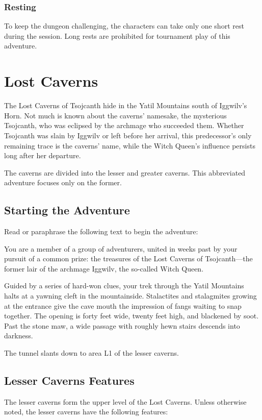 \documentclass[10pt,a4paper,twoside,bg=print,twocolumn,openany,nodeprecatedcode]{dndbook}
\begin{document}
\subsubsection{Resting}
To keep the dungeon challenging, the characters can take only one short rest during the session. Long rests are prohibited for tournament play of this adventure.

\section{Lost Caverns}
The Lost Caverns of Tsojcanth hide in the Yatil Mountains south of Iggwilv's Horn. Not much is known about the caverns' namesake, the mysterious Tsojcanth, who was eclipsed by the archmage who succeeded them. Whether Tsojcanth was slain by Iggwilv or left before her arrival, this predecessor's only remaining trace is the caverns' name, while the Witch Queen's influence persists long after her departure.

The caverns are divided into the lesser and greater caverns. This abbreviated adventure focuses only on the former.

\subsection{Starting the Adventure}
Read or paraphrase the following text to begin the adventure:

\begin{DndReadAloud}{}
You are a member of a group of adventurers, united in weeks past by your pursuit of a common prize: the treasures of the Lost Caverns of Tsojcanth—the former lair of the archmage Iggwilv, the so-called Witch Queen.

Guided by a series of hard-won clues, your trek through the Yatil Mountains halts at a yawning cleft in the mountainside. Stalactites and stalagmites growing at the entrance give the cave mouth the impression of fangs waiting to snap together. The opening is forty feet wide, twenty feet high, and blackened by soot. Past the stone maw, a wide passage with roughly hewn stairs descends into darkness.

\end{DndReadAloud}

The tunnel slants down to area L1 of the lesser caverns.

\subsection{Lesser Caverns Features}
The lesser caverns form the upper level of the Lost Caverns. Unless otherwise noted, the lesser caverns have the following features:
\end{document}
